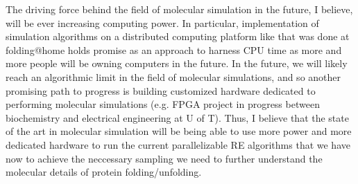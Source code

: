 \documentclass[12pt]{article}
\numberwithin{equation}{subsection}
\begin{document}
\begin{spacing}{1}
The driving force behind the field of molecular simulation in the future, I believe,  will be ever increasing computing power. In particular, implementation of simulation algorithms on a distributed computing platform like that was done at folding@home holds promise as an approach to harness CPU time as more and more people will be owning computers in the future. In the future, we will likely reach an algorithmic limit in the field of molecular simulations, and so another promising path to progress is building customized hardware dedicated to performing molecular simulations (e.g. FPGA project in progress between biochemistry and electrical engineering at U of T).  Thus, I believe that the state of the art in molecular simulation will be being able to use more power and more dedicated hardware to run the current parallelizable RE algorithms that we have now to achieve the neccessary sampling we need to further understand the molecular details of protein folding/unfolding.

\end{spacing}

\end{document}
